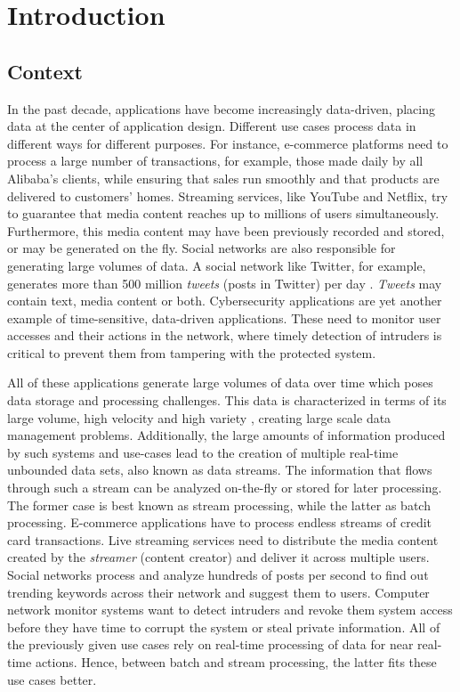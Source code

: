 \chapter{Introduction} \label{chap:intro} \minitoc

\section{Context} \label{sec:context}
In the past decade, applications have become increasingly data-driven, placing data at the center of application design. Different use cases process data in different ways for different purposes. For instance, e-commerce platforms need to process a large number of transactions, for example, those made daily by all Alibaba's clients, while ensuring that sales run smoothly and that products are delivered to customers' homes. Streaming services, like YouTube and Netflix, try to guarantee that media content reaches up to millions of users simultaneously. Furthermore, this media content may have been previously recorded and stored, or may be generated on the fly. Social networks are also responsible for generating large volumes of data. A social network like Twitter, for example, generates more than 500 million \textit{tweets} (posts in Twitter) per day \cite{twitter-throughput}. \textit{Tweets} may contain text, media content or both. Cybersecurity applications are yet another example of time-sensitive, data-driven applications. These need to monitor user accesses and their actions in the network, where timely detection of intruders is critical to prevent them from tampering with the protected system.

All of these applications generate large volumes of data over time which poses data storage and processing challenges. This data is characterized in terms of its large volume, high velocity and high variety \cite{Mavragani-GoogleTrends-SLR}, creating large scale data management problems. Additionally, the large amounts of information produced by such systems and use-cases lead to the creation of multiple real-time unbounded data sets, also known as data streams. The information that flows through such a stream can be analyzed on-the-fly or stored for later processing. The former case is best known as stream processing, while the latter as batch processing. E-commerce applications have to process endless streams of credit card transactions. Live streaming services need to distribute the media content created by the \textit{streamer} (content creator) and deliver it across multiple users. Social networks process and analyze hundreds of posts per second to find out trending keywords across their network and suggest them to users. Computer network monitor systems want to detect intruders and revoke them system access before they have time to corrupt the system or steal private information. All of the previously given use cases rely on real-time processing of data for near real-time actions. Hence, between batch and stream processing, the latter fits these use cases better.

